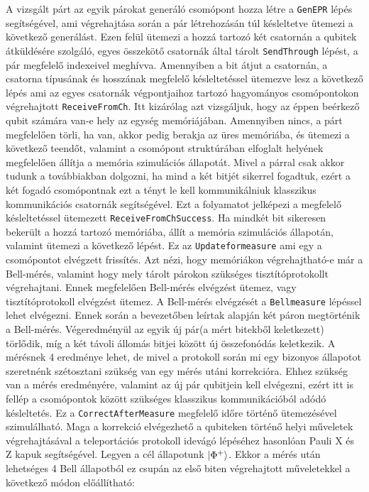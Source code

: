 A vizsgált párt az egyik párokat generáló csomópont hozza létre a \texttt{GenEPR} lépés segítségével, ami végrehajtása során a pár létrehozásán túl késleltetve ütemezi a következő generálást. Ezen felül ütemezi a hozzá tartozó két csatornán a qubitek átküldésére szolgáló, egyes összekötő csatornák által tárolt \texttt{SendThrough} lépést, a pár megfelelő indexeivel meghívva. Amennyiben a bit átjut a csatornán, a csatorna típusának és hosszának megfelelő késleltetéssel ütemezve lesz a következő lépés ami az egyes csatornák végpontjaihoz tartozó hagyományos csomópontokon végrehajtott \texttt{ReceiveFromCh}. Itt kizárólag azt vizsgáljuk, hogy az éppen beérkező qubit számára van-e hely az egység memóriájában. Amennyiben nincs, a párt megfelelően törli, ha van, akkor pedig berakja az üres memóriába, és ütemezi a következő teendőt, valamint a csomópont struktúrában elfoglalt helyének megfelelően állítja a memória szimulációs állapotát.  Mivel a párral csak akkor tudunk a továbbiakban dolgozni, ha mind a két bitjét sikerrel fogadtuk, ezért a két fogadó csomópontnak ezt a tényt le kell kommunikálniuk klasszikus kommunikációs csatornák segítségével. Ezt a folyamatot jelképezi a megfelelő késleltetéssel ütemezett \texttt{ReceiveFromChSuccess}. Ha mindkét bit sikeresen bekerült a hozzá tartozó memóriába, állít a memória szimulációs állapotán, valamint ütemezi a következő lépést. Ez az \texttt{Updateformeasure} ami egy a csomópontot elvégzett frissítés. Azt nézi, hogy memóriákon végrehajtható-e már a Bell-mérés, valamint hogy mely tárolt párokon szükséges tisztítóprotokollt végrehajtani.
Ennek megfelelően Bell-mérés elvégzést ütemez, vagy tisztítóprotokoll elvégzést ütemez. A Bell-mérés elvégzését a \texttt{Bellmeasure} lépéssel lehet elvégezni. Ennek során a bevezetőben leírtak alapján két páron megtörténik a Bell-mérés. Végeredményül az egyik új pár(a mért bitekből keletkezett) törlődik, míg a két távoli állomás bitjei között új összefonódás keletkezik. A mérésnek 4 eredménye lehet, de mivel a protokoll során mi egy bizonyos állapotot szeretnénk szétosztani szükség van egy mérés utáni korrekcióra. Ehhez szükség van a mérés eredményére, valamint az új pár qubitjein kell elvégezni, ezért itt is fellép a csomópontok között szükséges klasszikus kommunikációból adódó késleltetés. Ez a \texttt{CorrectAfterMeasure} megfelelő időre történő ütemezésével szimulálható. Maga a korrekció elvégezhető a qubiteken történő helyi műveletek végrehajtásával a teleportációs protokoll \cite{bennett1993teleporting} idevágó lépéséhez hasonlóan  Pauli X és Z kapuk segítségével. Legyen a cél állapotunk $\ket{\Phi^+}$. Ekkor a mérés után lehetséges 4 Bell állapotból ez csupán az első biten végrehajtott műveletekkel a következő módon előállítható:
